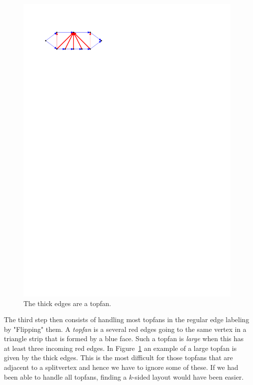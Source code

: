   \begin{figure}
    \centering
    \includegraphics[]{unifiedAlgo/img/topfanExample.pdf}
    \caption{The thick edges are a topfan.}
    \label{fig:algo:topfanExample}
  \end{figure}

  The third step then consists of handling most topfans in the regular edge labeling by "Flipping" them.
  A \emph{topfan} is a several red edges going to the same vertex in a triangle strip that is formed by a blue face.
  Such a topfan is \emph{large} when this has at least three incoming red edges.
  In Figure~\ref{fig:algo:topfanExample} an example of a large topfan is given by the thick edges.
  This is the most difficult for those topfans that are adjacent to a splitvertex and hence we have to ignore some of these.
  If we had been able to handle all topfans, finding a $k$-sided layout would have been easier.

